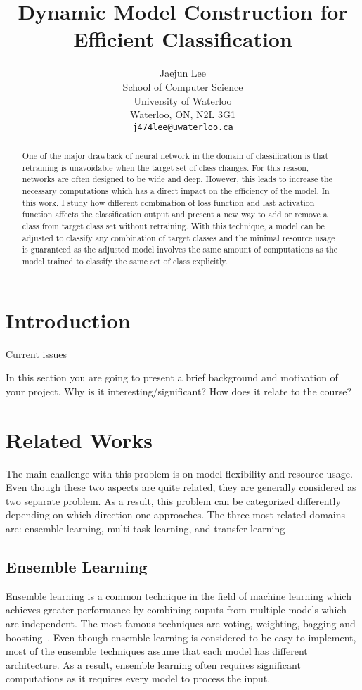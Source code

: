 \documentclass{article}
\title{Dynamic Model Construction for Efficient Classification}
\author{
	Jaejun Lee \\
	School of Computer Science\\
	University of Waterloo\\
	Waterloo, ON, N2L 3G1 \\
	\texttt{j474lee@uwaterloo.ca} \\
}
\begin{document}
\maketitle

\begin{abstract}

One of the major drawback of neural network in the domain of classification is that retraining is unavoidable when the target set of class changes. For this reason, networks are often designed to be wide and deep. However, this leads to increase the necessary computations which has a direct impact on the efficiency of the model. In this work, I study how different combination of loss function and last activation function affects the classification output and present a new way to add or remove a class from target class set without retraining. With this technique, a model can be adjusted to classify any combination of target classes and the minimal resource usage is guaranteed as the adjusted model involves the same amount of computations as the model trained to classify the same set of class explicitly.

\end{abstract}

\section{Introduction}

Current issues


In this section you are going to present a brief background and motivation of your project. Why is it interesting/significant? How does it relate to the course?

\section{Related Works}

The main challenge with this problem is on model flexibility and resource usage. Even though these two aspects are quite related, they are generally considered as two separate problem. As a result, this problem can be categorized differently depending on which direction one approaches. The three most related domains are: ensemble learning, multi-task learning, and transfer learning

\subsection{Ensemble Learning}
Ensemble learning is a common technique in the field of machine learning which achieves greater performance by combining ouputs from multiple models which are independent. The most famous techniques are voting, weighting, bagging and boosting~\cite{dietterich2000ensemble, breiman1996bagging, freund1996experiments}. Even though ensemble learning is considered to be easy to implement, most of the ensemble techniques assume that each model has different architecture. As a result, ensemble learning often requires significant computations as it requires every model to process the input.
\end{document}
